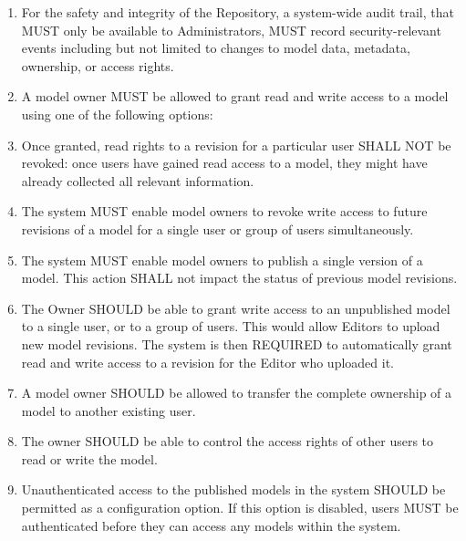 \begin{enumerate}[1]
\item For the safety and integrity of the Repository, a system-wide audit trail, that MUST only be available to Administrators, MUST record security-relevant events including but not limited to changes to model data, metadata, ownership, or access rights. 

\item A model owner MUST be allowed to grant read and write access to a model using one of the following options:

\item Once granted, read rights to a revision for a particular user SHALL NOT be revoked: once users have gained read access to a model, they might have already collected all relevant information.

\item The system MUST enable model owners to revoke write access to future revisions of a model for a single user or group of users simultaneously.

\item The system MUST enable model owners to publish a single version of a model. This action SHALL not impact the status of previous model revisions. 

\item The Owner SHOULD be able to grant write access to an unpublished model to a single user, or to a group of users. This would allow Editors to upload new model revisions. The system is then REQUIRED to automatically grant read and write access to a revision for the Editor who uploaded it.

\item A model owner SHOULD be allowed to transfer the complete ownership of a model to another existing user.

\item The owner SHOULD be able to control the access rights of other users to read or write the model.

\item Unauthenticated access to the published models in the system SHOULD be permitted as a configuration option. If this option is disabled, users MUST be authenticated before they can access any models within the system.


\end{enumerate}

